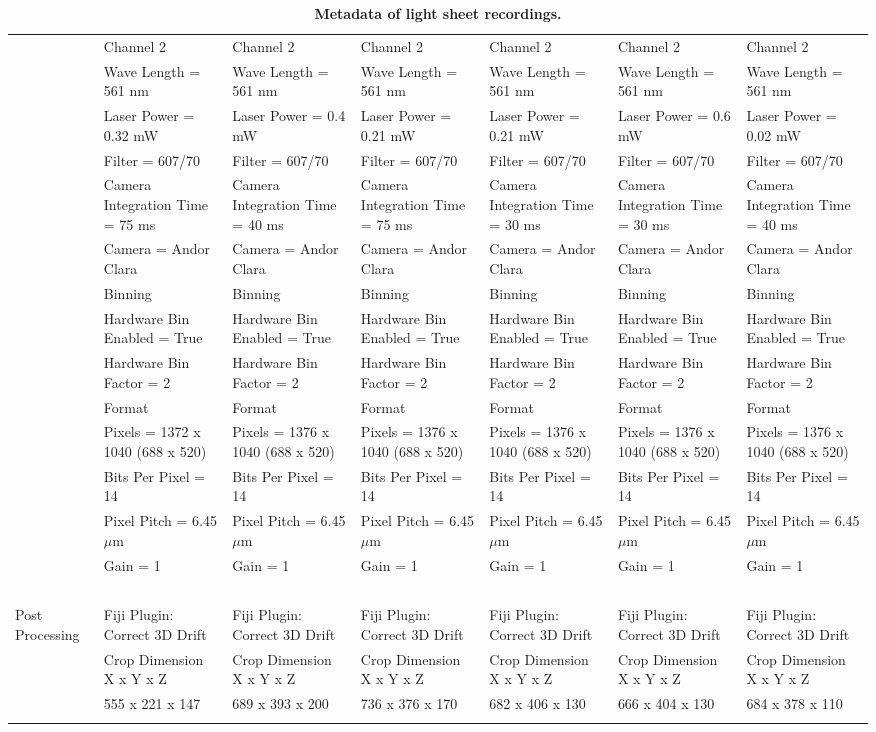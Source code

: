 \documentclass[11pt,a4paper, final]{article}
\begin{document}
\begin{sidewaystable}
\begin{longtable}{@{} l l l l l l l @{}}
& Channel 2 & Channel 2 & Channel 2 & Channel 2 & Channel 2 & Channel 2\\
& Wave Length = 561 nm & Wave Length = 561 nm & Wave Length = 561 nm & Wave Length = 561 nm & Wave Length = 561 nm & Wave Length = 561 nm\\
& Laser Power = 0.32 mW & Laser Power = 0.4 mW & Laser Power = 0.21 mW & Laser Power = 0.21 mW & Laser Power = 0.6 mW & Laser Power = 0.02 mW\\
& Filter = 607/70 & Filter = 607/70 & Filter = 607/70 & Filter = 607/70 & Filter = 607/70 & Filter = 607/70\\
& Camera Integration Time = 75 ms & Camera Integration Time = 40 ms & Camera Integration Time = 75 ms & Camera Integration Time = 30 ms & Camera Integration Time = 30 ms & Camera Integration Time = 40 ms\\
& Camera = Andor Clara & Camera = Andor Clara & Camera = Andor Clara & Camera = Andor Clara & Camera = Andor Clara & Camera = Andor Clara\\
& Binning & Binning & Binning & Binning & Binning & Binning\\
& Hardware Bin Enabled = True & Hardware Bin Enabled = True & Hardware Bin Enabled = True & Hardware Bin Enabled = True & Hardware Bin Enabled = True & Hardware Bin Enabled = True\\
& Hardware Bin Factor = 2 & Hardware Bin Factor = 2 & Hardware Bin Factor = 2 & Hardware Bin Factor = 2 & Hardware Bin Factor = 2 & Hardware Bin Factor = 2\\
& Format & Format & Format & Format & Format & Format\\
& Pixels = 1372 x 1040 (688 x 520) & Pixels = 1376 x 1040 (688 x 520) & Pixels = 1376 x 1040 (688 x 520) & Pixels = 1376 x 1040 (688 x 520) & Pixels = 1376 x 1040 (688 x 520) & Pixels = 1376 x 1040 (688 x 520)\\
& Bits Per Pixel = 14 & Bits Per Pixel = 14 & Bits Per Pixel = 14 & Bits Per Pixel = 14 & Bits Per Pixel = 14 & Bits Per Pixel = 14\\
& Pixel Pitch = 6.45 $\mu$m & Pixel Pitch = 6.45 $\mu$m & Pixel Pitch = 6.45 $\mu$m & Pixel Pitch = 6.45 $\mu$m & Pixel Pitch = 6.45 $\mu$m & Pixel Pitch = 6.45 $\mu$m\\
& Gain = 1 & Gain = 1 & Gain = 1 & Gain = 1 & Gain = 1 & Gain = 1\\
& \ & \ & \ & \ & \ & \ \\
Post Processing & Fiji Plugin: Correct 3D Drift & Fiji Plugin: Correct 3D Drift & Fiji Plugin: Correct 3D Drift & Fiji Plugin: Correct 3D Drift & Fiji Plugin: Correct 3D Drift & Fiji Plugin: Correct 3D Drift\\
& Crop Dimension X x Y x Z & Crop Dimension X x Y x Z & Crop Dimension X x Y x Z & Crop Dimension X x Y x Z & Crop Dimension X x Y x Z & Crop Dimension X x Y x Z\\
& 555 x 221 x 147 & 689 x 393 x 200 & 736 x 376 x 170 & 682 x 406 x 130 & 666 x 404 x 130 & 684 x 378 x 110\\
\bottomrule
\caption[Metadata of light sheet recordings.]{\textbf{Metadata of light sheet recordings.}}
\label{tab:metadata}
\end{longtable}
\end{sidewaystable}
\end{document}
